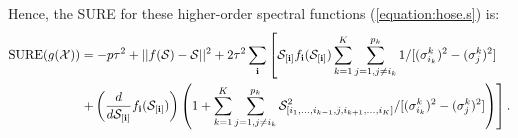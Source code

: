 Hence, the SURE for these higher-order spectral functions
(\ref{equation:hose.s}) is:
\begin{align*}
  \operatorname*{SURE}(g(\mathcal{X})) &= -p\tau^2 + ||f(\mathcal{S}) - \mathcal{S}||^2 + 2\tau^2\sum_{\bf i}\left[\mathcal{S}_{[\mathbf{i}]}f_{\bf i}(\mathcal{S}_{[\mathbf{i}]})\sum_{k=1}^K \sum_{j=1, j\neq i_k}^{p_k}1/[(\sigma_{i_k}^k)^2 - (\sigma_j^k)^2]\right. \\
  &\left. + \left(\frac{d}{d\mathcal{S}_{[\mathbf{i}]}}f_{\mathbf{i}}(\mathcal{S}_{[\mathbf{i}]})\right) \left(1 + \sum_{k=1}^K \sum_{j=1, j\neq i_k}^{p_k}\mathcal{S}_{[i_1,\ldots,i_{k-1},j,i_{k+1},\ldots,i_K]}^2/[(\sigma_{i_k}^k)^2 - (\sigma_j^k)^2] \right)\right].
\end{align*}
